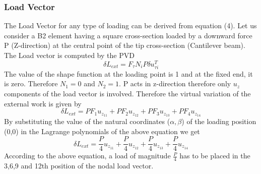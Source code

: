 \documentclass[a4paper,12pt]{article}
\begin{document}
\subsubsection*{Load Vector}
\indent\indent\indent The Load Vector for any type of loading can be derived from equation (4). Let us consider a B2 element having a square cross-section loaded by a downward force P (Z-direction) at the central point of the tip cross-section (Cantilever beam). The Load vector is computed by the PVD
\begin{equation}
\delta L_{ext} = F_{\tau}N_{i}P\delta u^{T}_{\tau i}
\label{PVD}
\end{equation}
The value of the shape function at the loading point is 1 and at the fixed end, it is zero. Therefore $N_{1} = 0$ and $N_{2} = 1$. P acts in z-direction therefore only $u_{z}$ components of the load vector is involved. Therefore the virtual variation of the external work is given by
$$
\delta L_{ext} = P F_{1} u_{z_{11}} + P F_{2} u_{z_{12}} + P F_{3} u_{z_{13}} + P F_{4} u_{z_{14}}
$$
By substituting the value of the natural coordinates ($\alpha,\beta$) of the loading position (0,0) in the Lagrange polynomials of the above equation we get
$$
\delta L_{ext} = \frac{P}{4} u_{z_{11}} + \frac{P}{4} u_{z_{12}} + \frac{P}{4} u_{z_{13}} + \frac{P}{4} u_{z_{14}} 
$$
According to the above equation, a load of magnitude $\frac{P}{4}$ has to be placed in the 3,6,9 and 12th position of the nodal load vector. 
\end{document}
